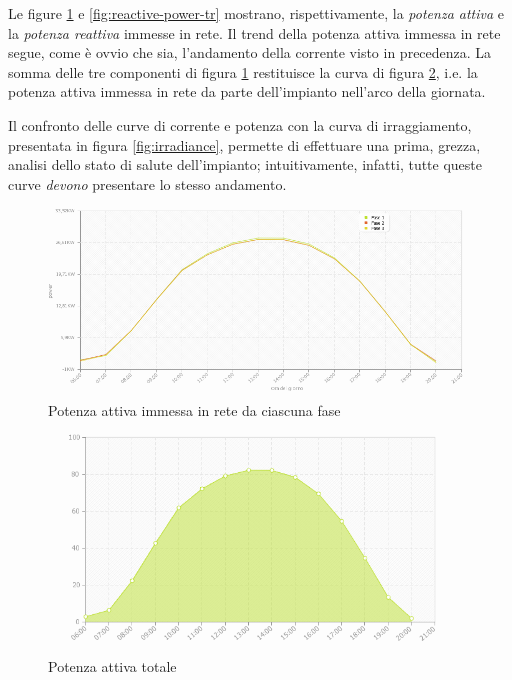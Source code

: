 %
Le figure \ref{fig:active-power-tr} e \ref{fig:reactive-power-tr} mostrano, rispettivamente, 
la \emph{potenza attiva} e la \emph{potenza reattiva} immesse in rete.
%
Il trend della potenza attiva immessa in rete segue, come \`e ovvio che sia, l'andamento della 
corrente visto in precedenza. 
%
La somma delle tre componenti di figura \ref{fig:active-power-tr} restituisce la curva di figura 
\ref{fig:total-active-power-tr}, i.e. la potenza attiva immessa in rete da parte dell'impianto
nell'arco della giornata.
%

%
Il confronto delle curve di corrente e potenza con la curva di irraggiamento, presentata in figura 
\ref{fig:irradiance}, permette di effettuare una prima, grezza, analisi dello stato di salute 
dell'impianto; intuitivamente, infatti, tutte queste curve \emph{devono} presentare lo stesso 
andamento.
%

%
\begin{figure}[!h]
\centering
\includegraphics[width=400pt]{img/portale/active-power-transponder.png}
\caption{Potenza attiva immessa in rete da ciascuna fase}
\label{fig:active-power-tr}
\end{figure}
%

%
\begin{figure}[!h]
\centering
\includegraphics[width=400pt]{img/portale/potenza-giornaliera.png}
\caption{Potenza attiva totale}
\label{fig:total-active-power-tr}
\end{figure}
%

